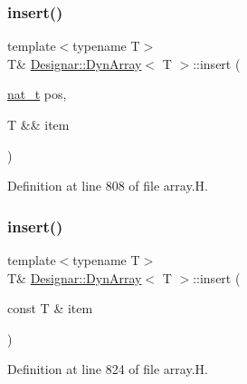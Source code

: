 \mbox{\label{class_designar_1_1_dyn_array_a919c60d5f02488027580173832af99e9}} 
\subsubsection{\texorpdfstring{insert()}{insert()}\hspace{0.1cm}{\footnotesize\ttfamily [2/4]}}
{\footnotesize\ttfamily template$<$typename T$>$ \\
T\& \hyperlink{class_designar_1_1_dyn_array}{Designar\+::\+Dyn\+Array}$<$ T $>$\+::insert (\begin{DoxyParamCaption}\item[{\hyperlink{namespace_designar_aa72662848b9f4815e7bf31a7cf3e33d1}{nat\+\_\+t}}]{pos,  }\item[{T \&\&}]{item }\end{DoxyParamCaption})\hspace{0.3cm}{\ttfamily [inline]}}



Definition at line 808 of file array.\+H.

\mbox{\label{class_designar_1_1_dyn_array_a761d20ea5068101a95e77629145099fe}} 
\subsubsection{\texorpdfstring{insert()}{insert()}\hspace{0.1cm}{\footnotesize\ttfamily [3/4]}}
{\footnotesize\ttfamily template$<$typename T$>$ \\
T\& \hyperlink{class_designar_1_1_dyn_array}{Designar\+::\+Dyn\+Array}$<$ T $>$\+::insert (\begin{DoxyParamCaption}\item[{const T \&}]{item }\end{DoxyParamCaption})\hspace{0.3cm}{\ttfamily [inline]}}



Definition at line 824 of file array.\+H.

\mbox{\label{class_designar_1_1_dyn_array_a976a619d52dcc91d531e1b95609ec971}} 
